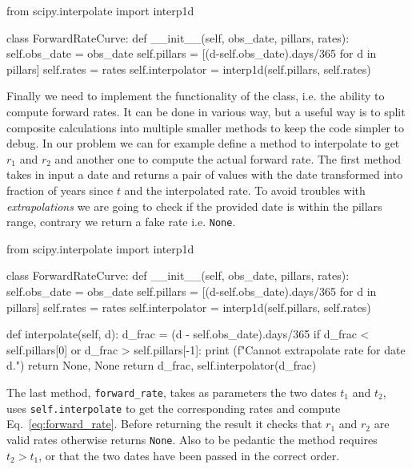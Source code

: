 \documentclass[]{article}
\begin{document}
\begin{ipython}
from scipy.interpolate import interp1d

class ForwardRateCurve:
	def __init__(self, obs_date, pillars, rates):
	    self.obs_date = obs_date
	    self.pillars = [(d-self.obs_date).days/365 for d in pillars]
	    self.rates = rates
	    self.interpolator = interp1d(self.pillars, self.rates)
\end{ipython}

Finally we need to implement the functionality of the class, i.e. the ability to compute forward rates. It can be done in various way, but a useful way is to split composite calculations into multiple smaller methods to keep the code simpler to debug. In our problem we can for example define a method to interpolate to get $r_1$ and $r_2$ and another one to compute the actual forward rate. 
The first method takes in input a date and returns a pair of values with the date transformed into fraction of years since $t$ and the interpolated rate. To avoid troubles with \emph{extrapolations} we are going to check if the provided date is within the pillars range, contrary we return a fake rate i.e. \texttt{None}.

\begin{ipython}
from scipy.interpolate import interp1d
	
class ForwardRateCurve:
	def __init__(self, obs_date, pillars, rates):
	    self.obs_date = obs_date
	    self.pillars = [(d-self.obs_date).days/365 for d in pillars]
	    self.rates = rates
	    self.interpolator = interp1d(self.pillars, self.rates)
	    
	def interpolate(self, d):
	    d_frac = (d - self.obs_date).days/365
	    if d_frac < self.pillars[0] or d_frac > self.pillars[-1]:
	        print (f"Cannot extrapolate rate for date {d}.")
	        return None, None
	    return d_frac, self.interpolator(d_frac)
\end{ipython}

The last method, \texttt{forward\_rate}, takes as parameters the two dates $t_1$ and $t_2$, uses \texttt{self.interpolate} to get the corresponding rates and compute Eq.~\ref{eq:forward_rate}. Before returning the result it checks that $r_1$ and $r_2$ are valid rates otherwise returns \texttt{None}. Also to be pedantic the method requires $t_2 > t_1$, or that the two dates have been passed in the correct order. 
\end{document}
